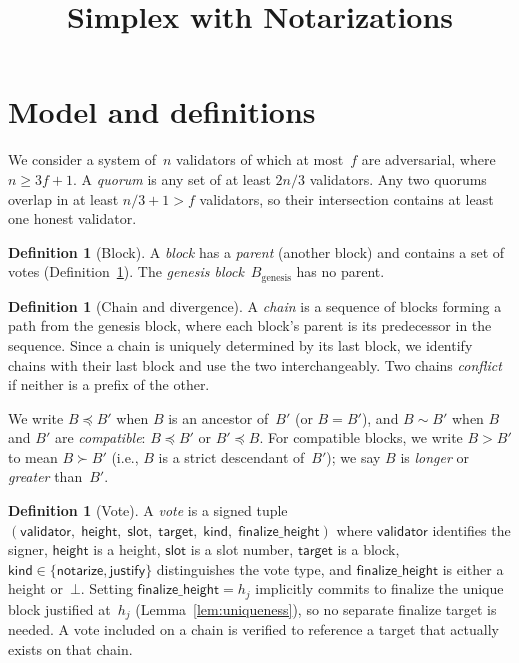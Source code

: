 \documentclass{article}
\title{Simplex with Notarizations}
\newcommand{\target}{\mathsf{target}}
\newcommand{\kind}{\mathsf{kind}}
\newcommand{\height}{\mathsf{height}}
\newcommand{\validator}{\mathsf{validator}}
\newcommand{\justify}{\mathsf{justify}}
\newcommand{\notarize}{\mathsf{notarize}}
\theoremstyle{plain}
\theoremstyle{definition}
\newtheorem{definition}[theorem]{Definition}
\theoremstyle{remark}
\begin{document}
\maketitle

\section{Model and definitions}

We consider a system of~$n$ validators of which at most~$f$ are adversarial, where $n \geq 3f + 1$.
A \emph{quorum} is any set of at least $2n/3$ validators.
Any two quorums overlap in at least $n/3 + 1 > f$ validators, so their intersection contains at least one honest validator.

\begin{definition}[Block]\label{def:block}
A \emph{block} has a \emph{parent} (another block) and contains a set of votes (Definition~\ref{def:vote}).
The \emph{genesis block}~$B_{\mathrm{genesis}}$ has no parent.
\end{definition}

\begin{definition}[Chain and divergence]\label{def:chain}
A \emph{chain} is a sequence of blocks forming a path from the genesis block, where each block's parent is its predecessor in the sequence.
Since a chain is uniquely determined by its last block, we identify chains with their last block and use the two interchangeably.
Two chains \emph{conflict} if neither is a prefix of the other.
\end{definition}

We write $B \preceq B'$ when $B$ is an ancestor of~$B'$ (or $B = B'$), and $B \sim B'$ when $B$ and $B'$ are \emph{compatible}: $B \preceq B'$ or $B' \preceq B$.
For compatible blocks, we write $B > B'$ to mean $B \succ B'$ (i.e., $B$ is a strict descendant of~$B'$); we say $B$ is \emph{longer} or \emph{greater} than~$B'$.

\begin{definition}[Vote]\label{def:vote}
A \emph{vote} is a signed tuple $(\validator,\; \height,\; \mathsf{slot},\; \target,\; \kind,\; \mathsf{finalize\_height})$ where $\validator$ identifies the signer, $\height$ is a height, $\mathsf{slot}$ is a slot number, $\target$ is a block, $\kind \in \{\notarize, \justify\}$ distinguishes the vote type, and $\mathsf{finalize\_height}$ is either a height or~$\bot$.
Setting $\mathsf{finalize\_height} = h_j$ implicitly commits to finalize the unique block justified at~$h_j$ (Lemma~\ref{lem:uniqueness}), so no separate finalize target is needed.
A vote included on a chain is verified to reference a target that actually exists on that chain.
\end{definition}
\end{document}
